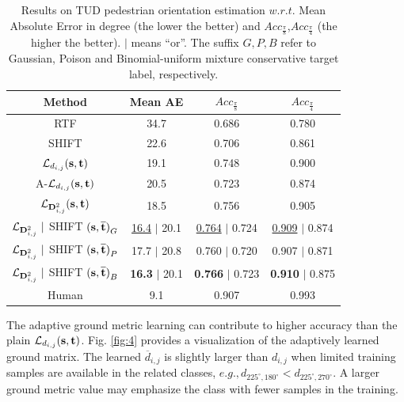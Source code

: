 \begin{table}[t]  
\scriptsize
\renewcommand\arraystretch{1.2}
\label{tab:different_nets}
\begin{center}
\begin{tabular}{|c|c|c|c|}
\hline
Method&Mean AE&{$Acc_{\frac{\pi}{8}}$}&{$Acc_{\frac{\pi}{4}}$}\\\hline\hline
RTF\cite{hara2017growing}&34.7&0.686&0.780\\\hline    
SHIFT\cite{hara2017designing}&22.6&0.706&0.861\\\hline\hline  

${\mathcal{L}_{d_{i,j}}}{(\rm{{\textbf{s},{\textbf{t}}}})}$&19.1&0.748&0.900\\\hline
A-${\mathcal{L}_{d_{i,j}}}{(\rm{{\textbf{s},{\textbf{t}}}})}$&20.5&0.723&0.874\\\hline

$\mathcal{L}_{{\rm\textbf{D}}_{i,j}^2}{(\rm{{\textbf{s},{\textbf{t}}}})}$&18.5&0.756&0.905\\\hline

$\mathcal{L}_{{\rm\textbf{D}}_{i,j}^2}~|$ SHIFT ${(\rm{{\textbf{s},\overline{\textbf{t}}}})}_G$&\underline{16.4} $|$ 20.1&\underline{0.764} $|$ 0.724&\underline{0.909} $|$ 0.874\\\hline    

$\mathcal{L}_{{\rm\textbf{D}}_{i,j}^2}~|$ SHIFT ${(\rm{{\textbf{s},\overline{\textbf{t}}}})}_P$&17.7 $|$ 20.8&0.760 $|$ 0.720&0.907 $|$ 0.871\\\hline   

$\mathcal{L}_{{\rm\textbf{D}}_{i,j}^2}~|$ SHIFT ${(\rm{{\textbf{s},\overline{\textbf{t}}}})}_B$&\textbf{16.3} $|$ 20.1&\textbf{0.766} $|$ 0.723&\textbf{0.910} $|$ 0.875\\\hline\hline    

Human \cite{hara2017designing}&9.1&0.907&0.993\\\hline    
    
\end{tabular}\label{tab:3}
\end{center}
\caption{Results on TUD pedestrian orientation estimation $w.r.t.$ Mean Absolute Error in degree (the lower the better) and {$Acc_{\frac{\pi}{8}}$},{$Acc_{\frac{\pi}{4}}$} (the higher the better). $|$ means ``or''. The suffix $G,P,B$ refer to Gaussian, Poison and Binomial-uniform mixture conservative target label, respectively.}
\end{table}


The adaptive ground metric learning can contribute to higher accuracy than the plain $\mathcal{L}_{d_{i,j}}(\rm{\textbf{s},{\textbf{t}}})$. Fig. \ref{fig:4} provides a visualization of the adaptively learned ground matrix. The learned $\overline{d}_{i,j}$ is slightly larger than ${d}_{i,j}$ when limited training samples are available in the related classes, $e.g., {d}_{225^{\circ},180^{\circ}}<{d}_{225^{\circ},270^{\circ}}$. A larger ground metric value may emphasize the class with fewer samples in the training.  

